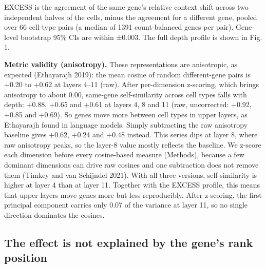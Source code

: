 \documentclass[
  11pt,
]{article}
\begin{document}
EXCESS is the agreement of the same gene's relative context shift across
two independent halves of the cells, minus the agreement for a different
gene, pooled over 66 cell-type pairs (a median of 1391 count-balanced
genes per pair). Gene-level bootstrap 95\% CIs are within ±0.003. The
full depth profile is shown in Fig. 1.

\textbf{Metric validity (anisotropy).} These representations are
anisotropic, as expected (Ethayarajh 2019): the mean cosine of random
different-gene pairs is +0.20 to +0.62 at layers 4--11 (raw). After
per-dimension z-scoring, which brings anisotropy to about 0.00,
same-gene self-similarity across cell types falls with depth: +0.88,
+0.65 and +0.61 at layers 4, 8 and 11 (raw, uncorrected: +0.92, +0.85
and +0.69). So genes move more between cell types in upper layers, as
Ethayarajh found in language models. Simply subtracting the raw
anisotropy baseline gives +0.62, +0.24 and +0.48 instead. This series
dips at layer 8, where raw anisotropy peaks, so the layer-8 value mostly
reflects the baseline. We z-score each dimension before every
cosine-based measure (Methods), because a few dominant dimensions can
drive raw cosines and one subtraction does not remove them ({Timkey and
van Schijndel} 2021). With all three versions, self-similarity is higher
at layer 4 than at layer 11. Together with the EXCESS profile, this
means that upper layers move genes more but less reproducibly. After
z-scoring, the first principal component carries only 0.07 of the
variance at layer 11, so no single direction dominates the cosines.

\subsection{The effect is not explained by the gene's rank
position}\label{the-effect-is-not-explained-by-the-genes-rank-position}
\end{document}
